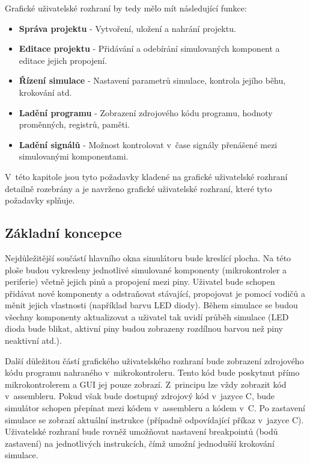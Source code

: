 Grafické uživatelské rozhraní by tedy mělo mít následující funkce:

\begin{itemize}
\item \textbf{Správa projektu} - Vytvoření, uložení a nahrání projektu.
\item \textbf{Editace projektu} - Přidávání a odebírání simulovaných komponent a editace jejich propojení.
\item \textbf{Řízení simulace} - Nastavení parametrů simulace, kontrola jejího běhu, krokování atd.
\item \textbf{Ladění programu} - Zobrazení zdrojového kódu programu, hodnoty proměnných, registrů, paměti.
\item \textbf{Ladění signálů} - Možnost kontrolovat v~čase signály přenášené mezi simulovanými komponentami.
\end{itemize}

V~této kapitole jsou tyto požadavky kladené na grafické uživatelské rozhraní detailně rozebrány a je navrženo grafické uživatelské rozhraní, které tyto
požadavky splňuje.

\subsection{Základní koncepce}

Nejdůležitější součástí hlavního okna simulátoru bude kreslící plocha. Na této ploše budou vykresleny jednotlivé simulované komponenty (mikrokontroler
a periferie) včetně jejich pinů a propojení mezi piny. Uživatel bude schopen přidávat nové komponenty a odstraňovat stávající, propojovat je pomocí
vodičů a měnit jejich vlastnosti (například barvu LED diody). Během simulace se budou všechny komponenty aktualizovat a uživatel tak uvidí průběh simulace
(LED dioda bude blikat, aktivní piny budou zobrazeny rozdílnou barvou než piny neaktivní atd.).

Další důležitou částí grafického uživatelského rozhraní bude zobrazení zdrojového kódu programu nahraného v~mikrokontroleru. Tento kód bude poskytnut
přímo mikrokontrolerem a GUI jej pouze zobrazí. Z~principu lze vždy zobrazit kód v~assembleru. Pokud však bude dostupný zdrojový kód v~jazyce C, bude 
simulátor schopen přepínat mezi kódem v~assembleru a kódem v~C. Po zastavení simulace se zobrazí aktuální instrukce (případně odpovídající příkaz v~jazyce C). Uživatelské rozhraní bude rovněž umožňovat nastavení breakpointů (bodů zastavení) na jednotlivých instrukcích, čímž umožní jednodušší krokování
simulace.


